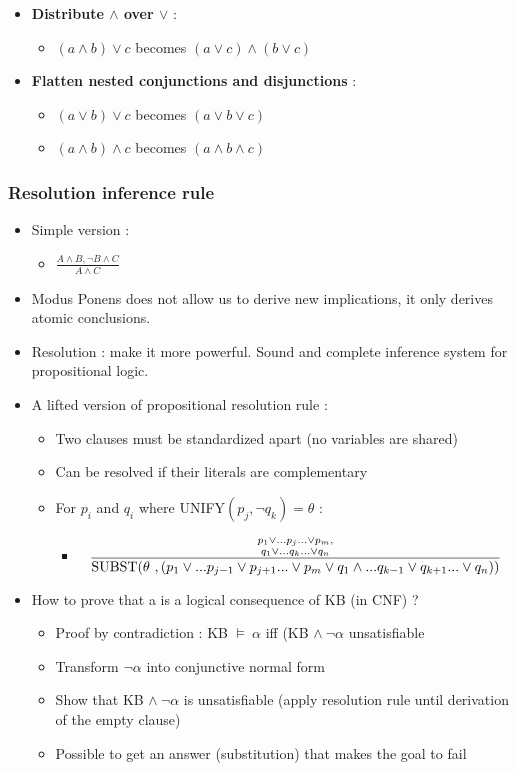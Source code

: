 \begin{itemize}
\item \textbf{Distribute $\land$ over $\lor$} :
	\begin{itemize}
	\item[] $(a \land b) \lor c$ becomes $(a \lor c) \land (b \lor c)$
	\end{itemize}
\item \textbf{Flatten nested conjunctions and disjunctions} :
	\begin{itemize}
	\item[] $(a \lor b) \lor c$ becomes $(a \lor b \lor c)$
	\item[] $(a \land b) \land c$ becomes $(a \land b \land c)$
	\end{itemize}
\end{itemize}

\subsubsection{Resolution inference rule}

\begin{itemize}
\item Simple version :
	\begin{itemize}
	\item[] $\frac{A \land B, \neg B \land C}{A \land C}$
	\end{itemize}
\item Modus Ponens does not allow us to derive new implications, it only derives atomic conclusions.
\item Resolution : make it more powerful. Sound and complete inference system for propositional logic.
\item A lifted version of propositional resolution rule :
	\begin{itemize}
	\item Two clauses must be standardized apart (no variables are shared)
	\item Can be resolved if their literals are complementary
	\item For $p_i$ and $q_i$ where UNIFY$(p_j, \neg q_k) = \theta$ :
		\begin{itemize}
		\item[] \[\frac{{p_1 \lor ... p_j ... \lor p_m, \atop q_1 \lor ... q_k ... \lor q_n}}{\text{SUBST}(\theta \ ,(p_1 \lor ... p_{j-1} \lor p_{j+1} ... \lor p_m \lor q_1 \land ... q_{k-1} \lor q_{k+1} ... \lor q_n))}\]
		\end{itemize}
	\end{itemize}
\item How to prove that a is a logical consequence of KB (in CNF) ? 
	\begin{itemize}
	\item Proof by contradiction : KB $\models \ \alpha$ iff (KB $\land \ \neg \alpha$ unsatisfiable
	\item Transform $\neg \alpha$ into conjunctive normal form
	\item Show that KB $\land \ \neg \alpha$ is unsatisfiable (apply resolution rule until derivation of the empty clause)
	\item Possible to get an answer (substitution) that makes the goal to fail
	\end{itemize}	
\end{itemize}
